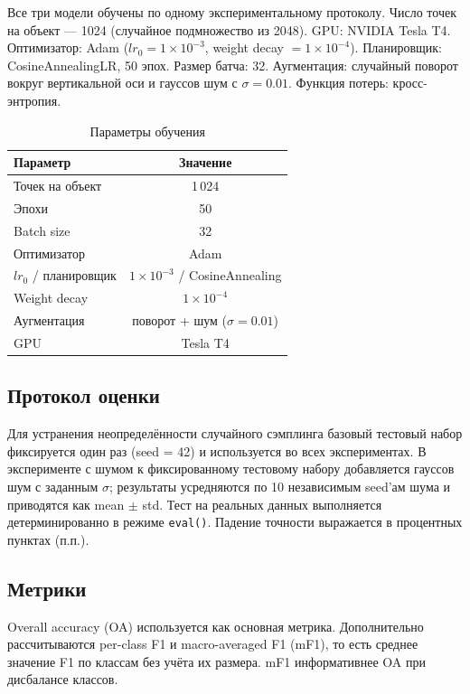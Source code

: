 \documentclass{misisarticle}
\begin{document}
Все три модели обучены по одному экспериментальному протоколу. Число точек на объект — 1024 (случайное подмножество из 2048). GPU: NVIDIA Tesla T4. Оптимизатор: Adam ($lr_0=1\times10^{-3}$, weight decay $=1\times10^{-4}$). Планировщик: CosineAnnealingLR, 50 эпох. Размер батча: 32. Аугментация: случайный поворот вокруг вертикальной оси и гауссов шум с $\sigma=0.01$. Функция потерь: кросс-энтропия.

\begin{table}[htbp]
\caption{Параметры обучения}
\label{tab:training}
\centering
\begin{tabular}{lc}
\toprule
Параметр & Значение \\
\midrule
Точек на объект & 1\,024 \\
Эпохи & 50 \\
Batch size & 32 \\
Оптимизатор & Adam \\
$lr_0$ / планировщик & $1\times10^{-3}$ / CosineAnnealing \\
Weight decay & $1\times10^{-4}$ \\
Аугментация & поворот + шум ($\sigma=0.01$) \\
GPU & Tesla T4 \\
\bottomrule
\end{tabular}
\end{table}

\subsection{Протокол оценки}

Для устранения неопределённости случайного сэмплинга базовый тестовый набор фиксируется один раз (seed = 42) и используется во всех экспериментах. В эксперименте с шумом к фиксированному тестовому набору добавляется гауссов шум с заданным $\sigma$; результаты усредняются по 10 независимым seed'ам шума и приводятся как mean $\pm$ std. Тест на реальных данных выполняется детерминированно в режиме \texttt{eval()}. Падение точности выражается в процентных пунктах (п.п.).

\subsection{Метрики}

Overall accuracy (OA) используется как основная метрика. Дополнительно рассчитываются per-class F1 и macro-averaged F1 (mF1), то есть среднее значение F1 по классам без учёта их размера. mF1 информативнее OA при дисбалансе классов.
\end{document}

